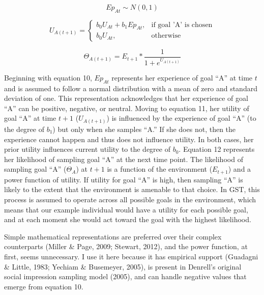 \documentclass[english,,man]{apa6}
\theoremstyle{definition}
\theoremstyle{definition}
\theoremstyle{definition}
\theoremstyle{remark}
\begin{document}
\begin{equation}
Ep_{At} \sim {N}(0,1)
\end{equation}

\begin{equation}
U_{A(t+1)} = 
  \begin{cases}
  b_0 U_{At} + b_1 Ep_{At}, & \text{if goal 'A' is chosen}\\
  b_0 U_{At}, & \text{otherwise}
  \end{cases}
\end{equation}

\begin{equation}
\Theta_{A(t+1)} = E_{t+1} * {\frac {1}{1 + e^{U_{A(t+1)}}}}
\end{equation}

Beginning with equation 10, \(Ep_{At}\) represents her experience of
goal \enquote{A} at time \(t\) and is assumed to follow a normal
distribution with a mean of zero and standard deviation of one. This
representation acknowledges that her experience of goal \enquote{A} can
be positive, negative, or neutral. Moving to equation 11, her utility of
goal \enquote{A} at time \(t+1\) (\(U_{A(t+1)}\)) is influenced by the
experience of goal \enquote{A} (to the degree of \(b_1\)) but only when
she samples \enquote{A.} If she does not, then the experience cannot
happen and thus does not influence utility. In both cases, her prior
utility influences current utility to the degree of \(b_0\). Equation 12
represents her likelihood of sampling goal \enquote{A} at the next time
point. The likelihood of sampling goal \enquote{A} (\(\Theta_{A}\)) at
\(t+1\) is a function of the environment (\(E_{t+1}\)) and a power
function of utility. If utility for goal \enquote{A} is high, then
sampling \enquote{A} is likely to the extent that the environment is
amenable to that choice. In GST, this process is assumed to operate
across all possible goals in the environment, which means that our
example individual would have a utility for each possible goal, and at
each moment she would act toward the goal with the highest likelihood.

Simple mathematical representations are preferred over their complex
counterparts (Miller \& Page, 2009; Stewart, 2012), and the power
function, at first, seems unnecessary. I use it here because it has
empirical support (Guadagni \& Little, 1983; Yechiam \& Busemeyer,
2005), is present in Denrell's original social impression sampling model
(2005), and can handle negative values that emerge from equation 10.
\end{document}
